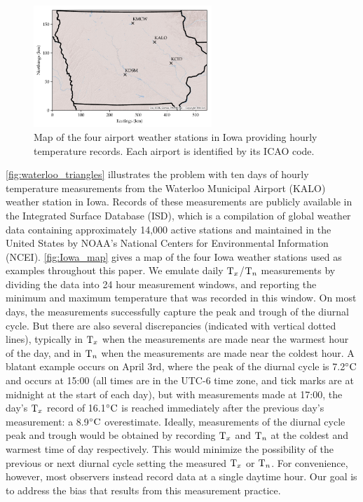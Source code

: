 \documentclass[12pt]{article}
\begin{document}
\begin{figure}[tbp]
\centering
\includegraphics[width=0.6\textwidth]{../figures/Iowa_map.pdf}
\caption{
\label{fig:Iowa_map}
Map of the four airport weather stations in Iowa providing hourly temperature records. 
Each airport is identified by its ICAO code.
}
\end{figure}

\autoref{fig:waterloo_triangles} illustrates the problem with ten days of hourly temperature measurements from the Waterloo Municipal Airport (KALO) weather station in Iowa. 
Records of these measurements are publicly available in the Integrated Surface Database (ISD), which is a compilation of global weather data containing approximately 14,000 active stations and maintained in the United States by NOAA's National Centers for Environmental Information (NCEI).
\autoref{fig:Iowa_map} gives a map of the four Iowa weather stations used as examples throughout this paper.
We emulate daily \(\mathrm{T}_{x}\)/\(\mathrm{T}_{n}\) measurements by dividing the data into 24 hour measurement windows, and reporting the minimum and maximum temperature that was recorded in this window.
On most days, the measurements successfully capture the peak and trough of the diurnal cycle.
But there are also several discrepancies (indicated with vertical dotted lines), typically in \(\mathrm{T}_{x}\) when the measurements are made near the warmest hour of the day, and in \(\mathrm{T}_{n}\) when the measurements are made near the coldest hour.
A blatant example occurs on April 3rd,
where the peak of the diurnal cycle is 7.2\({}^{\circ}\mathrm{C}\) and occurs at 15:00 (all times are in the UTC-6 time zone, and tick marks are at midnight at the start of each day), but with measurements made at 17:00, the day's \(\mathrm{T}_{x}\) record of 16.1\({}^{\circ}\mathrm{C}\) is reached immediately after the previous day's measurement: a 8.9\({}^{\circ}\mathrm{C}\) overestimate.
Ideally, measurements of the diurnal cycle peak and trough would be obtained by recording \(\mathrm{T}_{x}\) and \(\mathrm{T}_{n}\) at the coldest and warmest time of day respectively.
This would minimize the possibility of the previous or next diurnal cycle setting the measured \(\mathrm{T}_{x}\) or \(\mathrm{T}_{n}\).
For convenience, however, most observers instead record data at a single daytime hour.
Our goal is to address the bias that results from this measurement practice.
\end{document}
